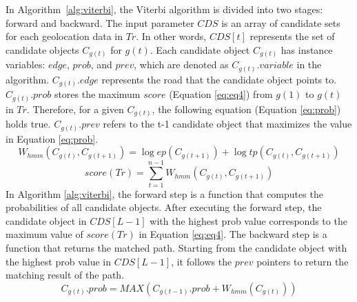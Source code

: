 \documentclass[preprint,12pt]{elsarticle}
\begin{document}
In Algorithm~\ref{alg:viterbi}, the Viterbi algorithm is divided into two stages: forward and backward. The input parameter $CDS$ is an array of candidate sets for each geolocation data in $Tr$. In other words, $CDS[t]$ represents the set of candidate objects $C_{g(t)}$ for $g(t)$. Each candidate object $C_{g(t)}$ has instance variables: $edge$, $prob$, and $prev$, which are denoted as $C_{g(t)}.variable$ in the algorithm. $C_{g(t)}.edge$ represents the road that the candidate object points to. $C_{g(t)}.prob$ stores the maximum $score$ (Equation \ref{eq:eq4}) from $g(1)$ to $g(t)$ in $Tr$. Therefore, for a given $C_{g(t)}$, the following equation (Equation \ref{eq:prob}) holds true. $C_{g(t)}.prev$ refers to the t-1 candidate object that maximizes the value in Equation \ref{eq:prob}.
\begin{equation}\label{eq:eq3}
	W_{hmm}(C_{g(t)},C_{g(t+1)}) =\log ep(C_{g(t+1)}) + \log tp(C_{g(t)},C_{g(t+1)})
\end{equation}
\begin{equation}\label{eq:eq4}
	score(Tr) = \sum_{t=1}^{n-1} W_{hmm}(C_{g(t)},C_{g(t+1)})
\end{equation}
In Algorithm \ref{alg:viterbi}, the forward step is a function that computes the probabilities of all candidate objects. After executing the forward step, the candidate object in $CDS[L-1]$ with the highest prob value corresponds to the maximum value of $score(Tr)$ in Equation \ref{eq:eq4}. The backward step is a function that returns the matched path. Starting from the candidate object with the highest prob value in $CDS[L-1]$, it follows the $prev$ pointers to return the matching result of the path.
\begin{equation}\label{eq:prob}
	C_{g(t)}.prob = MAX(C_{g(t-1)}.prob + W_{hmm}(C_{g(t)}))
\end{equation}
\end{document}
